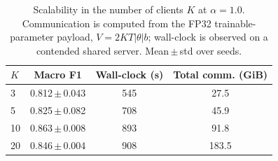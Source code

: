 \begin{table}[t]
\caption{Scalability in the number of clients $K$ at $\alpha{=}1.0$.
Communication is computed from the FP32 trainable-parameter payload,
$V=2KT|\theta|b$; wall-clock is observed on a contended shared server.
Mean\,$\pm$\,std over seeds.}
\label{tab:clients}
\centering\footnotesize
\setlength\tabcolsep{5pt}
\begin{tabular}{lccc}
\toprule
$K$ & Macro F1 & Wall-clock (s) & Total comm. (GiB)\\
\midrule
3 & 0.812\,$\pm$\,0.043 & 545 & 27.5 \\
5 & 0.825\,$\pm$\,0.082 & 708 & 45.9 \\
10 & 0.863\,$\pm$\,0.008 & 893 & 91.8 \\
20 & 0.846\,$\pm$\,0.004 & 908 & 183.5 \\
\bottomrule
\end{tabular}
\end{table}
